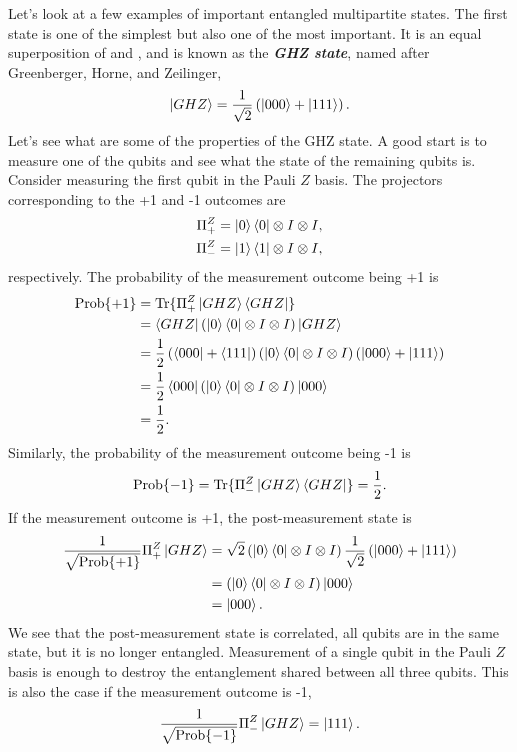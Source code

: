 Let's look at a few examples of important entangled multipartite states.
The first state is one of the simplest but also one of the most important.
It is an equal superposition of  and , and is known as the \textit{\textbf{GHZ state}}, named after Greenberger, Horne, and Zeilinger,
\begin{equation}
    \left| GHZ \right\rangle = \frac{1}{\sqrt{2}} \left( \left| 000 \right\rangle + \left| 111 \right\rangle \right).
\end{equation}
Let's see what are some of the properties of the GHZ state.
A good start is to measure one of the qubits and see what the state of the remaining qubits is.
Consider measuring the first qubit in the Pauli $Z$ basis.
The projectors corresponding to the +1 and -1 outcomes are
\begin{align}
    \Pi^Z_+ & = \left| 0 \right\rangle\left\langle 0 \right| \otimes I \otimes I, \\
    \Pi^Z_- & = \left| 1 \right\rangle\left\langle 1 \right| \otimes I \otimes I,
\end{align}
respectively.
The probability of the measurement outcome being +1 is
\begin{align}
    \text{Prob} \{+1\} & = \text{Tr} \{ \Pi^Z_+ \left| GHZ \right\rangle\left\langle GHZ \right| \} \nonumber\\
    & = \left\langle GHZ \right| \left( \left| 0 \right\rangle\left\langle 0 \right| \otimes I \otimes I \right) \left| GHZ \right\rangle \nonumber\\
    & = \frac{1}{2} \left( \left\langle 000 \right| + \left\langle 111 \right| \right) \left( \left| 0 \right\rangle\left\langle 0 \right| \otimes I \otimes I \right) \left( \left| 000 \right\rangle + \left| 111 \right\rangle \right) \nonumber\\
     & = \frac{1}{2} \left\langle 000 \right| \left( \left| 0 \right\rangle\left\langle 0 \right| \otimes I \otimes I \right) \left| 000 \right\rangle \nonumber\\
     & = \frac{1}{2}.
\end{align}
Similarly, the probability of the measurement outcome being -1 is
\begin{equation}
    \text{Prob}\{-1\} = \text{Tr}\{\Pi^Z_-\left| GHZ \right\rangle\left\langle GHZ \right|\} = \frac{1}{2}.
\end{equation}
If the measurement outcome is +1, the post-measurement state is
\begin{align}
    \frac{1}{\sqrt{\text{Prob}\{+1\}}} \Pi^Z_+ \left| GHZ \right\rangle & = \sqrt{2} \left( \left| 0 \right\rangle\left\langle 0 \right| \otimes I \otimes I \right) \frac{1}{\sqrt{2}} \left( \left| 000 \right\rangle + \left| 111 \right\rangle \right) \nonumber\\
    & = \left( \left| 0 \right\rangle\left\langle 0 \right| \otimes I \otimes I \right) \left| 000 \right\rangle \nonumber\\
    & = \left| 000 \right\rangle.
\end{align}
We see that the post-measurement state is correlated, all qubits are in the same state, but it is no longer entangled.
Measurement of a single qubit in the Pauli $Z$ basis is enough to destroy the entanglement shared between all three qubits.
This is also the case if the measurement outcome is -1,
\begin{equation}
    \frac{1}{\sqrt{\text{Prob}\{-1\}}} \Pi^Z_- \left| GHZ \right\rangle = \left| 111 \right\rangle.
\end{equation}

